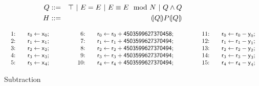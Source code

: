 \begin{eqnarray*}
  Q & ::= & \top
     \ |\   E = E
     \ |\   E \equiv E \mod N
     \ |\   Q \wedge Q\\
  H & ::= & {(\!|}{Q}{|\!)} P {(\!|}{Q}{|\!)}
\end{eqnarray*}


\begin{figure}[ht]
  \centering
  \[
  \begin{array}{lclcl}
    \begin{array}{rcl}
    \textmd{1:} && \dslcode{r}_0 \leftarrow \dslcode{x}_0; \\
    \textmd{2:} && \dslcode{r}_1 \leftarrow \dslcode{x}_1; \\
    \textmd{3:} && \dslcode{r}_2 \leftarrow \dslcode{x}_2; \\
    \textmd{4:} && \dslcode{r}_3 \leftarrow \dslcode{x}_3; \\
    \textmd{5:} && \dslcode{r}_5 \leftarrow \dslcode{x}_4; \\
    \end{array}
    &\hspace{.05\textwidth}&
    \begin{array}{rcl}
    \textmd{6:} && 
      \dslcode{r}_0 \leftarrow \dslcode{r}_0 + \dslcode{4503599627370458}; \\
    \textmd{7:} &&
      \dslcode{r}_1 \leftarrow \dslcode{r}_1 + \dslcode{4503599627370494}; \\
    \textmd{8:} &&
      \dslcode{r}_2 \leftarrow \dslcode{r}_2 + \dslcode{4503599627370494}; \\
    \textmd{9:} &&
      \dslcode{r}_3 \leftarrow \dslcode{r}_3 + \dslcode{4503599627370494}; \\
    \textmd{10:} && 
      \dslcode{r}_4 \leftarrow \dslcode{r}_4 + \dslcode{4503599627370494};\\
    \end{array}
    &\hspace{.05\textwidth}&
    \begin{array}{rcl}
    \textmd{11:} && \dslcode{r}_0 \leftarrow \dslcode{r}_0 - \dslcode{y}_0; \\
    \textmd{12:} && \dslcode{r}_1 \leftarrow \dslcode{r}_1 - \dslcode{y}_1; \\
    \textmd{13:} && \dslcode{r}_2 \leftarrow \dslcode{r}_2 - \dslcode{y}_2; \\
    \textmd{14:} && \dslcode{r}_3 \leftarrow \dslcode{r}_3 - \dslcode{y}_3; \\
    \textmd{15:} && \dslcode{r}_4 \leftarrow \dslcode{r}_4 - \dslcode{y}_4;
    \end{array}
  \end{array}
  \]
  \caption{Subtraction }
  \label{figure:dsl:subtraction}
\end{figure}


